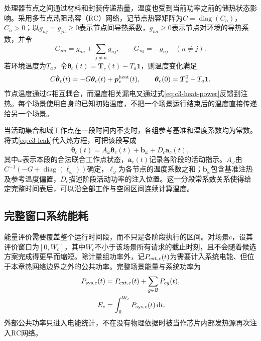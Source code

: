 处理器节点之间通过材料和封装传递热量，温度也受到当前功率之前的储热状态影响。采用多节点热阻热容（RC）网络\cite{source1,chantem2011,fdtm2022}，记节点热容矩阵为$C=\operatorname{diag}(C_n)$，$C_n>0$；以$g_{nj}=g_{jn}\ge0$表示节点间导热系数，$g_{na}\ge0$表示节点对环境的导热系数，并令
\begin{equation}
 G_{nn}=g_{na}+\sum_{j\ne n}g_{nj},\qquad
 G_{nj}=-g_{nj}\quad(n\ne j).
 \label{eq:c3-G}
\end{equation}
若环境温度为$T_a$，令$\boldsymbol\theta_c(t)=
\boldsymbol T_c(t)-T_a\mathbf1$，则温度变化满足
\begin{equation}
 C\dot{\boldsymbol\theta}_c(t)=
 -G\boldsymbol\theta_c(t)+\boldsymbol p^{\rm heat}_c(t),
 \qquad
 \boldsymbol\theta_c(0)=\boldsymbol T_c^0-T_a\mathbf1.
 \label{eq:c3-thermal-ode}
\end{equation}
节点温度通过$G$相互耦合，而温度相关漏电又通过式\eqref{eq:c3-heat-power}反馈到注热。每个场景使用自身的已知初始温度，不把一个场景运行结束后的温度直接传递给另一个场景。

当活动集合和域工作点在一段时间内不变时，各组参考基准和温度系数均为常数。将式\eqref{eq:c3-leak}代入热方程，可把该段写成
\begin{equation}
 \dot{\boldsymbol\theta}_c(t)=
 A_\omega\boldsymbol\theta_c(t)
 +\boldsymbol b_\omega+D_c\boldsymbol a_c(t),
 \label{eq:c3-affine-ode}
\end{equation}
其中$\omega$表示本段的合法联合工作点状态，$\boldsymbol a_c(t)$记录各阶段的活动指示。$A_\omega$由$C^{-1}(-G+\operatorname{diag}(\boldsymbol\ell_\omega))$确定，$\boldsymbol\ell_\omega$为各节点的温度系数之和；$\boldsymbol b_\omega$包含基准注热及参考温度偏置，$D_c$描述阶段活动功率的注入位置。这一分段常系数关系使得给定完整时间表后，可以沿全部工作与空闲区间连续计算温度。

\subsection{完整窗口系统能耗}

能量评价需要覆盖整个运行时间段，而不只是各阶段执行的区间。对场景$c$，设其评价窗口为$[0,W_c]$，其中$W_c$不小于该场景所有请求的截止时刻，且不会随着候选方案完成得更早而缩短。除计量组功率外，记$P_{{\rm ext},c}(t)$为需要计入系统电能、但位于本章热网络边界之外的公共功率。完整场景能量与系统功率为
\begin{equation}
 \begin{aligned}
 P_{{\rm sys},c}(t)
    &=P_{{\rm ext},c}(t)+\sum_{g\in\mathcal B}P_{cg}(t),\\
 E_c&=\int_0^{W_c}P_{{\rm sys},c}(t)\,\mathrm dt.
 \end{aligned}
 \label{eq:c3-scene-energy}
\end{equation}
外部公共功率只进入电能统计，不在没有物理依据时被当作芯片内部发热源再次注入RC网络。

